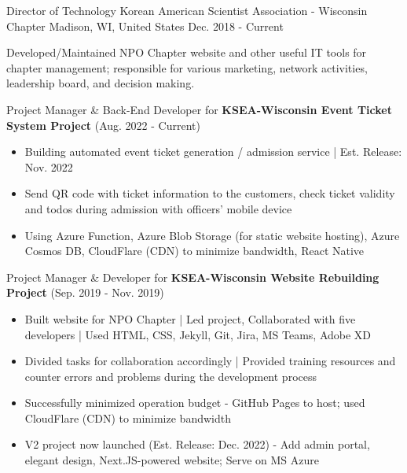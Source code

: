 

\begin{cventries}

  \cventry
  {Director of Technology} %
  {Korean American Scientist Association - Wisconsin Chapter} %
  {Madison, WI, United States} %
  {Dec. 2018 - Current} %
  {
    \begin{cvitems} %
      \item {Developed/Maintained NPO Chapter website and other useful IT tools for chapter management; responsible for various marketing, network activities, leadership board, and decision making.}
      \item {Project Manager \& Back-End Developer for \textbf{KSEA-Wisconsin Event Ticket System Project} (Aug. 2022 - Current)}
      \begin{itemize}
        \item {Building automated event ticket generation / admission service | Est. Release: Nov. 2022}
        \item {Send QR code with ticket information to the customers, check ticket validity and todos during admission with officers' mobile device}
        \item {Using Azure Function, Azure Blob Storage (for static website hosting), Azure Cosmos DB, CloudFlare (CDN) to minimize bandwidth, React Native}
      \end{itemize}
      \item {Project Manager \& Developer for \textbf{KSEA-Wisconsin Website Rebuilding Project} (Sep. 2019 - Nov. 2019)}
      \begin{itemize}
        \item {Built website for NPO Chapter | Led project, Collaborated with five developers | Used HTML, CSS, Jekyll, Git, Jira, MS Teams, Adobe XD}
        \item {Divided tasks for collaboration accordingly | Provided training resources and counter errors and problems during the development process}
        \item {Successfully minimized operation budget - GitHub Pages to host; used CloudFlare (CDN) to minimize bandwidth}
        \item {V2 project now launched (Est. Release: Dec. 2022) - Add admin portal, elegant design, Next.JS-powered website; Serve on MS Azure}
      \end{itemize}
    \end{cvitems}
  }


\end{cventries}
